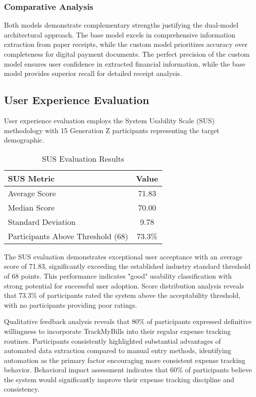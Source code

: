 \subsubsection{Comparative Analysis}
Both models demonstrate complementary strengths justifying the dual-model architectural approach. The base model excels in comprehensive information extraction from paper receipts, while the custom model prioritizes accuracy over completeness for digital payment documents. The perfect precision of the custom model ensures user confidence in extracted financial information, while the base model provides superior recall for detailed receipt analysis.

\subsection{User Experience Evaluation}
User experience evaluation employs the System Usability Scale (SUS) methodology with 15 Generation Z participants representing the target demographic.

\begin{table}[htbp]
\centering
\caption{SUS Evaluation Results}
\label{tab:sus-results}
\begin{tabular}{|l|c|}
\hline
\textbf{SUS Metric} & \textbf{Value} \\
\hline
Average Score & 71.83 \\
Median Score & 70.00 \\
Standard Deviation & 9.78 \\
Participants Above Threshold (68) & 73.3\% \\
\hline
\end{tabular}
\end{table}

The SUS evaluation demonstrates exceptional user acceptance with an average score of 71.83, significantly exceeding the established industry standard threshold of 68 points. This performance indicates "good" usability classification with strong potential for successful user adoption. Score distribution analysis reveals that 73.3\% of participants rated the system above the acceptability threshold, with no participants providing poor ratings.

Qualitative feedback analysis reveals that 80\% of participants expressed definitive willingness to incorporate TrackMyBills into their regular expense tracking routines. Participants consistently highlighted substantial advantages of automated data extraction compared to manual entry methods, identifying automation as the primary factor encouraging more consistent expense tracking behavior. Behavioral impact assessment indicates that 60\% of participants believe the system would significantly improve their expense tracking discipline and consistency.

